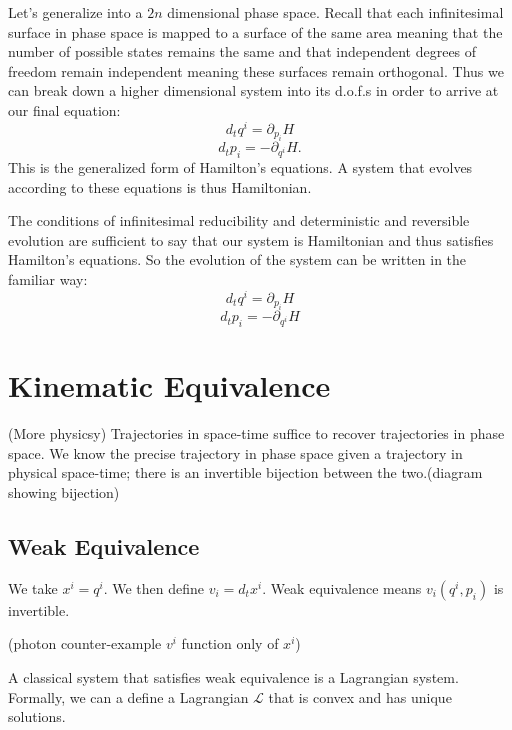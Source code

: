 \documentclass{article}
\begin{document}
	Let's generalize into a $2n$ dimensional phase space. Recall that each infinitesimal surface in phase space is mapped to a surface of the same area meaning that the number of possible states remains the same and that independent degrees of freedom remain independent meaning these surfaces remain orthogonal. Thus we can break down a higher dimensional system into its d.o.f.s in order to arrive at our final equation: $$d_tq^i = \partial_{p_i}H$$ $$d_tp_i = -\partial_{q^i}H.$$ This is the generalized form of Hamilton's equations. A system that evolves according to these equations is thus Hamiltonian.

\begin{prop}
	The conditions of infinitesimal reducibility and deterministic and reversible evolution are sufficient to say that our system is Hamiltonian and thus satisfies Hamilton's equations. So the evolution of the system can be written in the familiar way:
	$$d_tq^i = \partial_{p_i}H$$
	$$d_tp_i = -\partial_{q^i}H$$
\end{prop} 

\section{Kinematic Equivalence}

\begin{assump}
	(More physicsy) Trajectories in space-time suffice to recover trajectories in phase space. We know the precise trajectory in phase space given a trajectory in physical space-time; there is an invertible bijection between the two.(diagram showing bijection)
\end{assump}

\subsection{Weak Equivalence}

\begin{defn}
	We take $x^i = q^i$. We then define $v_i = d_tx^i$. Weak equivalence means $v_i(q^i, p_i)$ is invertible.
\end{defn}

(photon counter-example $v^i$ function only of $x^i$)

\begin{prop}
	A classical system that satisfies weak equivalence is a Lagrangian system. Formally, we can a define a Lagrangian $\mathcal{L}$ that is convex and has unique solutions.
\end{prop}
\end{document}
